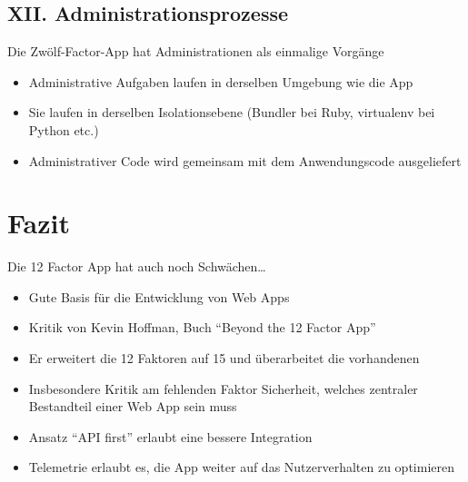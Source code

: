 \documentclass[fleqn,10pt]{SelfArx} %
\begin{document}
\subsection{XII. Administrationsprozesse}
Die Zwölf-Factor-App hat Administrationen als einmalige Vorgänge
\begin{itemize}
	\item Administrative Aufgaben laufen in derselben Umgebung wie die App
	\item Sie laufen in derselben Isolationsebene (Bundler bei Ruby, virtualenv bei Python etc.)
	\item Administrativer Code wird gemeinsam mit dem Anwendungscode ausgeliefert
\end{itemize}
\section{Fazit}
Die 12 Factor App hat auch noch Schwächen\ldots
	\begin{itemize}
	\item Gute Basis für die Entwicklung von Web Apps
	\item Kritik von Kevin Hoffman, Buch \enquote{Beyond the 12 Factor App}~\cite{beyond}
	\item Er erweitert die 12 Faktoren auf 15 und überarbeitet die vorhandenen
	\item Insbesondere Kritik am fehlenden Faktor Sicherheit, welches zentraler Bestandteil einer Web App sein muss
	\item Ansatz \enquote{API first} erlaubt eine bessere Integration
	\item Telemetrie erlaubt es, die App weiter auf das Nutzerverhalten zu optimieren
\end{itemize}




%



\end{document}
